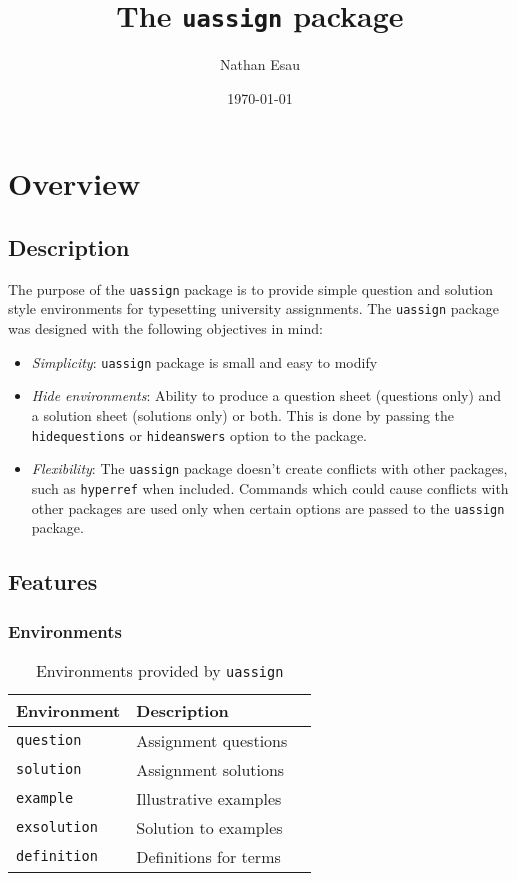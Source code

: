 \documentclass[twocolumn,twoside,11pt]{report}
\title{The \texttt{uassign} package}
\author{Nathan Esau}
\date{\today}
\begin{document}
\maketitle

\setcounter{secnumdepth}{-1}
\chapter{Overview}

\section{Description}
The purpose of the \texttt{uassign} package is to provide simple question and solution style environments for typesetting  university assignments. The \texttt{uassign} package was designed with the following objectives in mind:

\begin{itemize}
\item \textit{Simplicity}: \texttt{uassign} package is small and easy to modify
\item \textit{Hide environments}: Ability to produce a question sheet (questions only) and a solution sheet (solutions only) or both. This is done by passing the \texttt{hidequestions} or \texttt{hideanswers} option to the package.
\item \textit{Flexibility}: The \texttt{uassign} package doesn't create conflicts with other packages, such as \texttt{hyperref} when included. Commands which could cause conflicts with other packages are used only when certain options are passed to the \texttt{uassign} package.

\end{itemize}%

\section{Features}

\subsection{Environments}

\begin{table}[!htpb]
\centering
\begin{tabular}{l l l}
\hline
Environment & Description \\ \hline
\texttt{question} & Assignment questions \\ 
\texttt{solution} & Assignment solutions \\
\texttt{example} & Illustrative examples \\ 
\texttt{exsolution} & Solution to examples \\ 
\texttt{definition} & Definitions for terms \\ \hline
\end{tabular}
\caption{Environments provided by \texttt{uassign}}
\end{table}
\end{document}
